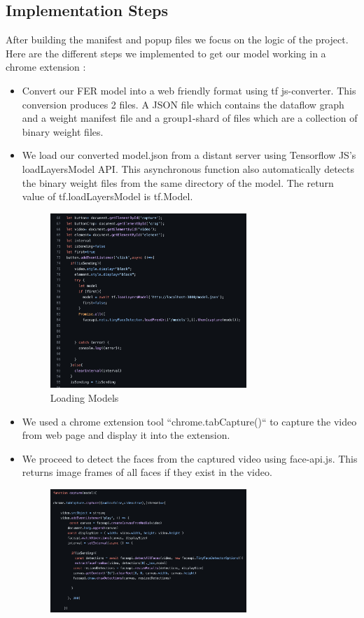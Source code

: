 \documentclass[12pt,a4paper,oneside,english]{book}
\begin{document}
\subsection{Implementation Steps}
After building the manifest and popup files we focus on the logic of the project. Here are the different steps we implemented to get our model working in a chrome extension : 
\begin{itemize}
\item Convert our FER model into a web friendly format using tf js-converter. This conversion produces 2 files. A JSON file which contains the dataflow graph and a weight manifest file and a group1-shard of files which are a collection of binary weight files.
\item We load our converted model.json from a distant server using Tensorflow JS's loadLayersModel API. This asynchronous function also automatically detects the binary weight files from the same directory of the model. The return value of tf.loadLayersModel is tf.Model.
\begin{figure}[H]
    \centering
    \includegraphics[width=0.7\textwidth]{figures/LoadingModels.png}
    \caption{Loading Models}
    \label{fig:loadingmodels}
\end{figure}
\item We used a chrome extension tool “chrome.tabCapture()“ to capture the video from web page and display it into the extension.
\item We proceed to detect the faces from the captured video using face-api.js. This returns image frames of all faces if they exist in the video.
\begin{figure}[H]
    \centering
    \includegraphics[width=0.7\textwidth]{figures/CapturingVideo.png}

\end{figure}
\end{itemize}
\end{document}
